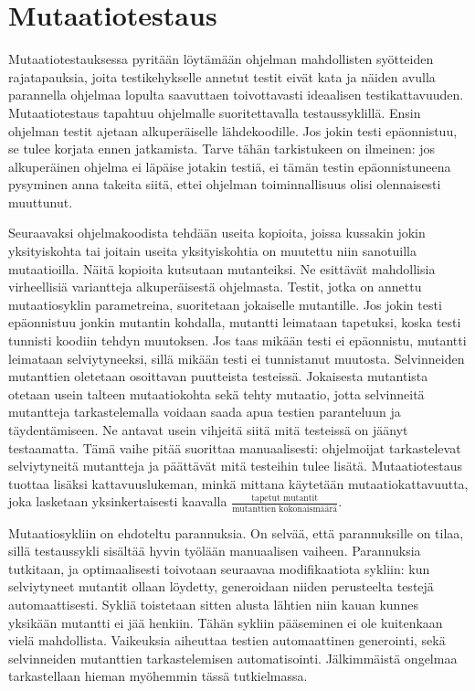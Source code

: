 \documentclass[finnish]{tktltiki2}
\begin{document}
\section{Mutaatiotestaus}
Mutaatiotestauksessa pyritään löytämään ohjelman mahdollisten syötteiden rajatapauksia, joita testikehykselle annetut testit eivät kata ja näiden avulla parannella ohjelmaa lopulta saavuttaen toivottavasti ideaalisen testikattavuuden. Mutaatiotestaus tapahtuu ohjelmalle suoritettavalla testaussyklillä. Ensin ohjelman testit ajetaan alkuperäiselle lähdekoodille. Jos jokin testi epäonnistuu, se tulee korjata ennen jatkamista. Tarve tähän tarkistukeen on ilmeinen: jos alkuperäinen ohjelma ei läpäise jotakin testiä, ei tämän testin epäonnistuneena pysyminen anna takeita siitä, ettei ohjelman toiminnallisuus olisi olennaisesti muuttunut.

Seuraavaksi ohjelmakoodista tehdään useita kopioita, joissa kussakin jokin yksityiskohta tai joitain useita yksityiskohtia on muutettu niin sanotuilla mutaatioilla. Näitä kopioita kutsutaan mutanteiksi. Ne esittävät mahdollisia virheellisiä variantteja alkuperäisestä ohjelmasta. Testit, jotka on annettu mutaatiosyklin parametreina, suoritetaan jokaiselle mutantille. Jos jokin testi epäonnistuu jonkin mutantin kohdalla, mutantti leimataan tapetuksi, koska testi tunnisti koodiin tehdyn muutoksen. Jos taas mikään testi ei epäonnistu, mutantti leimataan selviytyneeksi, sillä mikään testi ei tunnistanut muutosta. Selvinneiden mutanttien oletetaan osoittavan puutteista testeissä. Jokaisesta mutantista otetaan usein talteen mutaatiokohta sekä tehty mutaatio, jotta selvinneitä mutantteja tarkastelemalla voidaan saada apua testien paranteluun ja täydentämiseen. Ne antavat usein vihjeitä siitä mitä testeissä on jäänyt testaamatta. Tämä vaihe pitää suorittaa manuaalisesti: ohjelmoijat tarkastelevat selviytyneitä mutantteja ja päättävät mitä testeihin tulee lisätä. Mutaatiotestaus tuottaa lisäksi kattavuuslukeman, minkä mittana käytetään mutaatiokattavuutta, joka lasketaan yksinkertaisesti kaavalla $\frac{\text{tapetut mutantit}}{\text{mutanttien kokonaismäärä}}$.

Mutaatiosykliin on ehdoteltu parannuksia. On selvää, että parannuksille on tilaa, sillä testaussykli sisältää hyvin työlään manuaalisen vaiheen. Parannuksia tutkitaan, ja optimaalisesti toivotaan seuraavaa modifikaatiota sykliin: kun selviytyneet mutantit ollaan löydetty, generoidaan niiden perusteelta testejä automaattisesti. Sykliä toistetaan sitten alusta lähtien niin kauan kunnes yksikään mutantti ei jää henkiin. Tähän sykliin pääseminen ei ole kuitenkaan vielä mahdollista. Vaikeuksia aiheuttaa testien automaattinen generointi, sekä selvinneiden mutanttien tarkastelemisen automatisointi. Jälkimmäistä ongelmaa tarkastellaan hieman myöhemmin tässä tutkielmassa.
\end{document}
